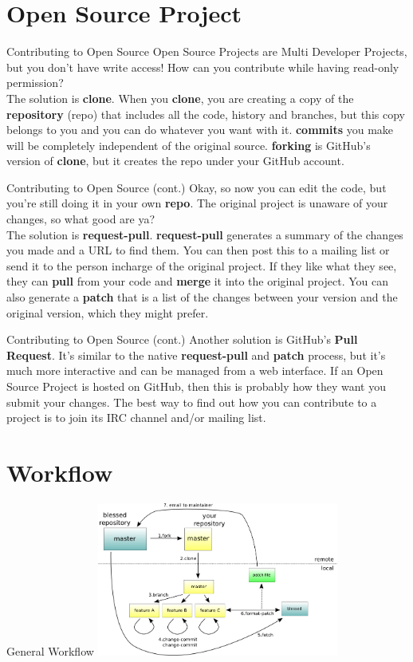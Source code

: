 \documentclass{beamer}
\begin{document}
\section{Open Source Project}

\begin{frame}{Contributing to Open Source}
  Open Source Projects are Multi Developer Projects, but you don't have write access! How can you contribute while having read-only permission?\\
    \pause
  The solution is \textbf{clone}. When you \textbf{clone}, you are creating a copy of the \textbf{repository} (repo) that includes all the code, history and branches, but this copy belongs to you and you can do whatever you want with it. \textbf{commits} you make will be completely independent of the original source. \textbf{forking} is GitHub's version of \textbf{clone}, but it creates the repo under your GitHub account.
\end{frame}

\begin{frame}{Contributing to Open Source (cont.)}
  Okay, so now you can edit the code, but you're still doing it in your own \textbf{repo}. The original project is unaware of your changes, so what good are ya?\\
  
  \pause
  The solution is \textbf{request-pull}. \textbf{request-pull} generates a summary of the changes you made and a URL to find them. You can then post this to a mailing list or send it to the person incharge of the original project. If they like what they see, they can \textbf{pull} from your code and \textbf{merge} it into the original project. You can also generate a \textbf{patch} that is a list of the changes between your version and the original version, which they might prefer.
  \end{frame}
  \begin{frame}{Contributing to Open Source (cont.)}
  Another solution is GitHub's \textbf{Pull Request}. It's similar to the native \textbf{request-pull} and \textbf{patch} process, but it's much more interactive and can be managed from a web interface. If an Open Source Project is hosted on GitHub, then this is probably how they want you submit your changes.
  \vfill
  \pause
  The best way to find out how you can contribute to a project is to join its IRC channel and/or mailing list.
\end{frame}


\section{Workflow}
\begin{frame}{General Workflow}
 \includegraphics[width=300px]{workflow.png}
\end{frame}
\end{document}

